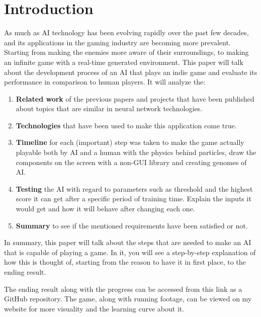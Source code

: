\chapter{Introduction}
As much as AI technology has been evolving rapidly over the past few decades, and its applications in the gaming industry are becoming more prevalent. Starting from making the enemies more aware of their surroundings, to making an infinite game with a real-time generated environment. This paper will talk about the development process of an AI that plays an indie game and evaluate its performance in comparison to human players. It will  analyze the:

\begin{enumerate}
\item \textbf{Related work} of the previous papers and projects that have been published about topics that are similar in neural network technologies.
\item \textbf{Technologies} that have been used to make this application come true.
\item \textbf{Timeline} for each (important) step was taken to make the game actually playable both by AI and a human with the physics behind particles, draw the components on the screen with a non-GUI library and creating genomes of AI.
\item \textbf{Testing} the AI with regard to parameters such as threshold and the highest score it can get after a specific period of training time. Explain the inputs it would get and how it will behave after changing each one.
\item \textbf{Summary} to see if the mentioned requirements have been satisfied or not.
\end{enumerate}

In summary, this paper will talk about the steps that are needed to make an AI that is capable of playing a game. In it, you will see a step-by-step explanation of how this is thought of, starting from the reason to have it in first place, to the ending result.

The ending result along with the progress can be accessed from this link \cite{Mahfouz_Survive_Line_2023} as a GitHub repository. The game, along with running footage, can be viewed on my website \cite{Survive_Line_-_Ahmed_Mahfouz} for more visuality and the learning curve about it.
